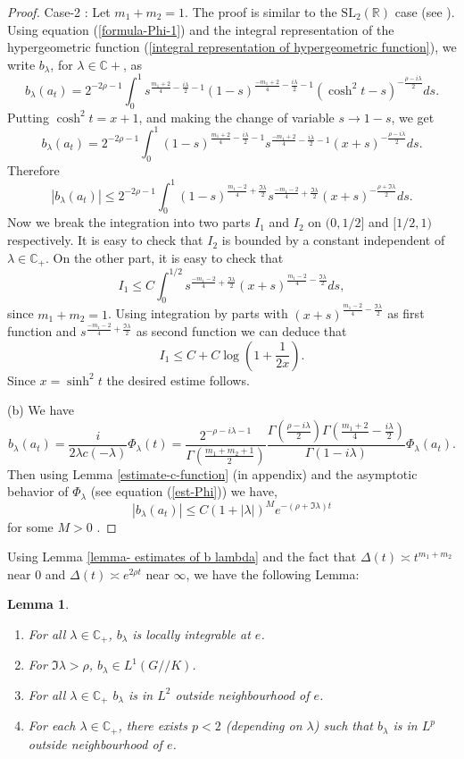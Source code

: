 \documentclass[11pt,reqno]{amsart}
\newcommand{\R}{\mathbb R}%
\newcommand{\C}{\mathbb C}%
\newtheorem{lemma}[theorem]{Lemma}
\theoremstyle{definition}
\theoremstyle{definition}
\numberwithin{equation}{section}
\begin{document}
\begin{proof}
Case-2 : Let $m_1+m_2=1$. The proof is similar to the $\mathrm{SL}_2(\R)$ case (see \cite[Lemma 2.3]{Ben-2} ). Using equation (\ref{formula-Phi-1}) and the integral representation of the hypergeometric function (\ref{integral representation of hypergeometric function}), we  write $b_\lambda$, for $\lambda\in\mathbb{C}+$, as
$$
b_\lambda(a_t)=
2^{-2\rho-1
}\int_0^1s^{\frac{m_1+2}{4}-\frac{i\lambda}{2}-1}(1-s)^{\frac{-m_1+2}{4}-\frac{i\lambda}{2}-1}(\cosh^2t-s)^{-\frac{\rho-i\lambda}{2}}ds.
$$
Putting $\cosh^2 t=x+1$, and making the change of variable $s\rightarrow 1-s$, we get 
$$
b_\lambda(a_t)=
2^{-2\rho-1
}\int_0^1 (1-s)^{\frac{m_1+2}{4}-\frac{i\lambda}{2}-1} s^{\frac{-m_1+2}{4}-\frac{i\lambda}{2}-1}(x+s)^{-\frac{\rho-i\lambda}{2}}ds.
$$
Therefore $$|b_\lambda(a_t)|\leq 2^{-2\rho-1
}\int_0^1 (1-s)^{\frac{m_1-2}{4}+\frac{\Im\lambda}{2}} s^{\frac{-m_1-2}{4}+\frac{\Im\lambda}{2}}(x+s)^{-\frac{\rho+\Im\lambda}{2}}ds.$$Now we break the integration into two parts $I_1$ and $I_2$ on $(0, 1/2]$ and $[1/2, 1)$ respectively. It is easy to check that $I_2$ is bounded by a constant independent of $\lambda\in \C_+$.
On the other part, it is easy to check that $$I_1\leq C \int_0^{1/2}s^{\frac{-m_1-2}{4}+\frac{\Im\lambda}{2}}(x+s)^{\frac{m_1-2}{4}-\frac{\Im\lambda}{2}}ds,$$ since $m_1 + m_2=1$. Using integration by parts with $(x+s)^{\frac{m_1-2}{4}-\frac{\Im\lambda}{2}}$ as  first function and $s^{\frac{-m_1-2}{4}+\frac{\Im\lambda}{2}}$ as second function we can deduce that $$I_1\leq C+ C\log\left(1 + \frac{1}{2x}\right).$$ Since $x=\sinh^2 t$ the desired estime follows.



(b) We have $$b_\lambda(a_t)=\frac{i}{2\lambda c(-\lambda)}\Phi_\lambda(t)=\frac{2^{-\rho-i\lambda-1}}{\Gamma(\frac{m_1 + m_2 +1}{2})}\frac{\Gamma(\frac{\rho-i\lambda}{2})\Gamma(\frac{m_1+2}{4}-\frac{i\lambda}{2})}{\Gamma(1-i\lambda)}\Phi_\lambda(a_t).$$Then using Lemma \ref{estimate-c-function} (in appendix) and the asymptotic behavior of $\Phi_\lambda$ (see equation (\ref{est-Phi})) we have, $$|b_\lambda(a_t)| \leq C(1 + |\lambda|)^Me^{-(\rho+\Im\lambda)t}$$ for some $M>0$ .
\end{proof}

Using Lemma \ref{lemma- estimates of b lambda} and the fact that  $\Delta(t)\asymp t^{m_1+m_2}$ near $0$ and $\Delta(t)\asymp e^{2\rho t}$ near $\infty$, we have the following  Lemma:
\begin{lemma}\label{lemma-2}
\begin{enumerate}
\item [(a)] For all $\lambda\in\C_+$, $b_\lambda$ is locally integrable at $e$.
\item [(b)] For $\Im \lambda>\rho$, $b_\lambda\in L^1(G//K)$.
\item[(c)]For all $\lambda\in\C_+$ $b_\lambda$ is in $L^2$ outside neighbourhood of $e$. 
\item[(d)]For each $\lambda\in\C_+$, there exists $p<2$ (depending on $\lambda$) such that $b_\lambda$ is in $L^p$ outside neighbourhood of $e$. 
\end{enumerate}
\end{lemma}
\end{document}
